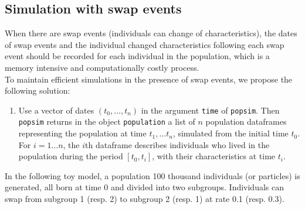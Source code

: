 \hypertarget{simulationswap}{%
\subsection{Simulation with swap events}\label{simulationswap}}

When there are swap events (individuals can change of characteristics), the dates of swap events and the individual changed characteristics following each swap event should be recorded for each individual in the population, which is a memory intensive and computationally costly process.\\
To maintain efficient simulations in the presence of swap events, we propose the following solution:

\begin{enumerate}
\def\labelenumi{\arabic{enumi}.}
\tightlist
\item
  Use a vector of dates \((t_0,\dots, t_n)\) in the argument \texttt{time} of \texttt{popsim}. Then \texttt{popsim} returns in the object \texttt{population} a list of \(n\) population dataframes representing the population at time \(t_1,\dots t_n\), simulated from the initial time \(t_0\).\\
  For \(i=1\dots n\), the \(i\)th dataframe describes individuals who lived in the population during the period \([t_0,t_i]\), with their characteristics at time \(t_i\).
\end{enumerate}

In the following toy model, a population 100 thousand individuals (or particles) is generated, all born at time 0 and divided into two subgroups. Individuals can swap from subgroup 1 (resp. 2) to subgroup 2 (resp. 1) at rate 0.1 (resp. 0.3).

